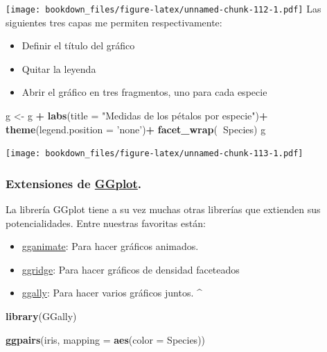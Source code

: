 \documentclass[]{book}
\newenvironment{Shaded}{\begin{snugshade}}{\end{snugshade}}
\newcommand{\DataTypeTok}[1]{\textcolor[rgb]{0.13,0.29,0.53}{#1}}
\newcommand{\KeywordTok}[1]{\textcolor[rgb]{0.13,0.29,0.53}{\textbf{#1}}}
\newcommand{\NormalTok}[1]{#1}
\newcommand{\OperatorTok}[1]{\textcolor[rgb]{0.81,0.36,0.00}{\textbf{#1}}}
\newcommand{\StringTok}[1]{\textcolor[rgb]{0.31,0.60,0.02}{#1}}
\providecommand{\tightlist}{%
  \setlength{\itemsep}{0pt}\setlength{\parskip}{0pt}}
\begin{document}
\texttt{[image: bookdown\_files/figure-latex/unnamed-chunk-112-1.pdf]}
Las siguientes tres capas me permiten respectivamente:

\begin{itemize}
\tightlist
\item
  Definir el título del gráfico
\item
  Quitar la leyenda
\item
  Abrir el gráfico en tres fragmentos, uno para cada especie
\end{itemize}

\begin{Shaded}
\begin{Highlighting}[]
\NormalTok{g <-}\StringTok{ }\NormalTok{g }\OperatorTok{+}
\StringTok{  }\KeywordTok{labs}\NormalTok{(}\DataTypeTok{title =} \StringTok{"Medidas de los pétalos por especie"}\NormalTok{)}\OperatorTok{+}
\StringTok{  }\KeywordTok{theme}\NormalTok{(}\DataTypeTok{legend.position =} \StringTok{'none'}\NormalTok{)}\OperatorTok{+}
\StringTok{  }\KeywordTok{facet_wrap}\NormalTok{(}\OperatorTok{~}\NormalTok{Species)}
\NormalTok{g}
\end{Highlighting}
\end{Shaded}

\texttt{[image: bookdown\_files/figure-latex/unnamed-chunk-113-1.pdf]}

\hypertarget{extensiones-de-ggplot.}{%
\subsubsection{\texorpdfstring{Extensiones de \href{http://www.ggplot2-exts.org/gallery/}{GGplot}.}{Extensiones de GGplot.}}\label{extensiones-de-ggplot.}}

La librería GGplot tiene a su vez muchas otras librerías que extienden sus potencialidades. Entre nuestras favoritas están:

\begin{itemize}
\tightlist
\item
  \href{https://gganimate.com/}{gganimate}: Para hacer gráficos animados.
\item
  \href{https://cran.r-project.org/web/packages/ggridges/vignettes/introduction.html}{ggridge}: Para hacer gráficos de densidad faceteados
\item
  \href{https://ggobi.github.io/ggally/}{ggally}: Para hacer varios gráficos juntos.
  \^{}
\end{itemize}

\begin{Shaded}
\begin{Highlighting}[]
\KeywordTok{library}\NormalTok{(GGally)}

\KeywordTok{ggpairs}\NormalTok{(iris,  }\DataTypeTok{mapping =} \KeywordTok{aes}\NormalTok{(}\DataTypeTok{color =}\NormalTok{ Species))}
\end{Highlighting}
\end{Shaded}
\end{document}
